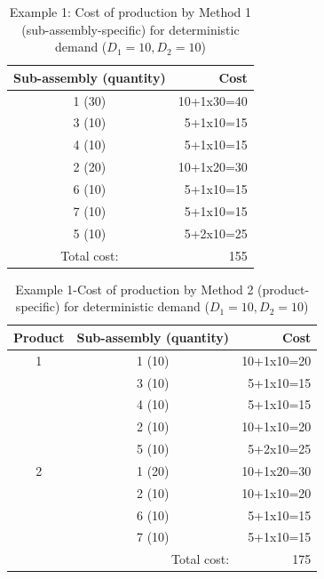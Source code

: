 \documentclass[twoside,onecolumn,12pt,letterpaper]{article}
\begin{document}
\begin{table}[htbp]
\caption{Example 1: Cost of production by Method 1 (sub-assembly-specific) for deterministic demand ($D_1=10, D_2=10$)}
\begin{center}
\begin{tabular}{|c|r|}
\hline
Sub-assembly (quantity) & Cost \\ \hline
1 (30) & 10+1x30=40 \\ \hline
3 (10) & 5+1x10=15 \\ \hline
4 (10) & 5+1x10=15 \\ \hline
2 (20) & 10+1x20=30 \\ \hline
6 (10) & 5+1x10=15 \\ \hline
7 (10) & 5+1x10=15 \\ \hline
5 (10) & 5+2x10=25 \\ \hline
Total cost: & 155 \\ \hline
\end{tabular}
\end{center}
\label{table:cost_MTS}
\end{table}

\begin{table}[htbp]
\centering
\caption{Example 1-Cost of production by Method 2 (product-specific) for deterministic demand ($D_1=10, D_2=10$)}
\begin{tabular}{|c|c|r|}
\hline
Product & Sub-assembly (quantity) & Cost \\ \hline
\multicolumn{ 1}{|c|}{1 } & 1 (10) & 10+1x10=20 \\ \cline{ 2- 3}
\multicolumn{ 1}{|l|}{} & 3 (10) & 5+1x10=15 \\ \cline{ 2- 3}
\multicolumn{ 1}{|l|}{} & 4 (10) & 5+1x10=15 \\ \cline{ 2- 3}
\multicolumn{ 1}{|l|}{} & 2 (10) & 10+1x10=20 \\ \cline{ 2- 3}
\multicolumn{ 1}{|l|}{} & 5 (10) & 5+2x10=25 \\ \hline
\multicolumn{ 1}{|c|}{2} & 1 (20) & 10+1x20=30 \\ \cline{ 2- 3}
\multicolumn{ 1}{|l|}{} & 2 (10) & 10+1x10=20 \\ \cline{ 2- 3}
\multicolumn{ 1}{|l|}{} & 6 (10) & 5+1x10=15 \\ \cline{ 2- 3}
\multicolumn{ 1}{|l|}{} & 7 (10) & 5+1x10=15 \\ \hline
\multicolumn{ 2}{|r|}{Total cost:} & \multicolumn{1}{r|}{175} \\ \hline
\end{tabular}
\label{table:cost_MTO}
\end{table}
\FloatBarrier
\end{document}

